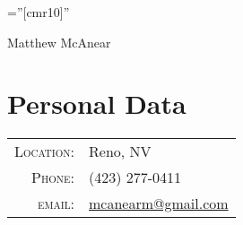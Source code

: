 \documentclass[a4paper,10pt]{article}
\begin{document}
\pagestyle{empty} %

\font\fb=''[cmr10]'' %

\par{\centering
		{\Huge Matthew McAnear
	}\bigskip\par}

\section{Personal Data}

\begin{tabular}{rl}
    \textsc{Location:}  & Reno, NV\\
    \textsc{Phone:}     & (423) 277-0411\\
    \textsc{email:}     & \href{mailto:mcanearm@gmail.com}{mcanearm@gmail.com}
\end{tabular}

\end{document}
